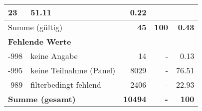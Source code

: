 \begin{longtable}{lXrrr}
       \num{23} &
       \num[round-mode=places,round-precision=2]{51,11} &
         \num[round-mode=places,round-precision=2]{0,22} \\
     \midrule
     \multicolumn{2}{l}{Summe (gültig)} &
       \textbf{\num{45}} &
     \textbf{100} &
       \textbf{\num[round-mode=places,round-precision=2]{0,43}} \\
     \multicolumn{5}{l}{\textbf{Fehlende Werte}}\\
       -998 &
       keine Angabe &
         \num{14} &
        - &
         \num[round-mode=places,round-precision=2]{0,13} \\
       -995 &
       keine Teilnahme (Panel) &
         \num{8029} &
        - &
         \num[round-mode=places,round-precision=2]{76,51} \\
       -989 &
       filterbedingt fehlend &
         \num{2406} &
        - &
         \num[round-mode=places,round-precision=2]{22,93} \\
     \midrule
     \multicolumn{2}{l}{\textbf{Summe (gesamt)}} &
          \textbf{\num{10494}} &
        \textbf{-} &
        \textbf{100} \\
     \bottomrule
     \end{longtable}
     
